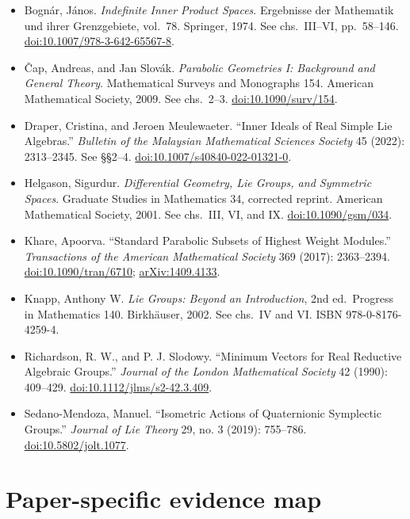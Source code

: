 \documentclass[
  10pt,
  letterpaper,
  oneside]{scrartcl}
\providecommand{\tightlist}{%
  \setlength{\itemsep}{0pt}\setlength{\parskip}{0pt}}
\begin{document}
\begin{itemize}
\tightlist
\item
  Bognár, János. \emph{Indefinite Inner Product Spaces}. Ergebnisse der
  Mathematik und ihrer Grenzgebiete, vol.~78. Springer, 1974. See
  chs.~III--VI, pp.~58--146.
  \href{https://doi.org/10.1007/978-3-642-65567-8}{doi:10.1007/978-3-642-65567-8}.
\item
  Čap, Andreas, and Jan Slovák. \emph{Parabolic Geometries I: Background
  and General Theory}. Mathematical Surveys and Monographs 154. American
  Mathematical Society, 2009. See chs.~2--3.
  \href{https://doi.org/10.1090/surv/154}{doi:10.1090/surv/154}.
\item
  Draper, Cristina, and Jeroen Meulewaeter. ``Inner Ideals of Real
  Simple Lie Algebras.'' \emph{Bulletin of the Malaysian Mathematical
  Sciences Society} 45 (2022): 2313--2345. See §§2--4.
  \href{https://doi.org/10.1007/s40840-022-01321-0}{doi:10.1007/s40840-022-01321-0}.
\item
  Helgason, Sigurdur. \emph{Differential Geometry, Lie Groups, and
  Symmetric Spaces}. Graduate Studies in Mathematics 34, corrected
  reprint. American Mathematical Society, 2001. See chs.~III, VI, and
  IX. \href{https://doi.org/10.1090/gsm/034}{doi:10.1090/gsm/034}.
\item
  Khare, Apoorva. ``Standard Parabolic Subsets of Highest Weight
  Modules.'' \emph{Transactions of the American Mathematical Society}
  369 (2017): 2363--2394.
  \href{https://doi.org/10.1090/tran/6710}{doi:10.1090/tran/6710};
  \href{https://arxiv.org/abs/1409.4133}{arXiv:1409.4133}.
\item
  Knapp, Anthony W. \emph{Lie Groups: Beyond an Introduction}, 2nd
  ed.~Progress in Mathematics 140. Birkhäuser, 2002. See chs.~IV and VI.
  ISBN 978-0-8176-4259-4.
\item
  Richardson, R. W., and P. J. Slodowy. ``Minimum Vectors for Real
  Reductive Algebraic Groups.'' \emph{Journal of the London Mathematical
  Society} 42 (1990): 409--429.
  \href{https://doi.org/10.1112/jlms/s2-42.3.409}{doi:10.1112/jlms/s2-42.3.409}.
\item
  Sedano-Mendoza, Manuel. ``Isometric Actions of Quaternionic Symplectic
  Groups.'' \emph{Journal of Lie Theory} 29, no. 3 (2019): 755--786.
  \href{https://doi.org/10.5802/jolt.1077}{doi:10.5802/jolt.1077}.
\end{itemize}

\clearpage
\section{Paper-specific evidence map}\label{paper-specific-evidence-map}
\end{document}
